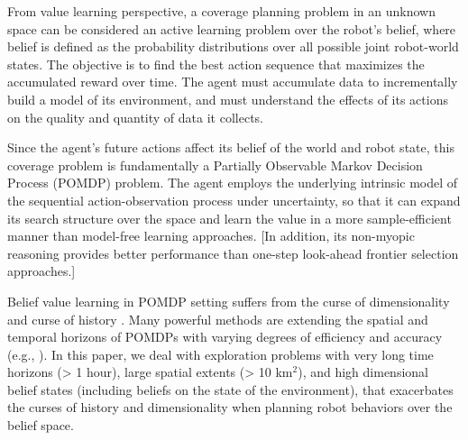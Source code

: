 \documentclass[letterpaper]{article} %
\newcommand{\phdone}[1]{} %
\begin{document}


From value learning perspective, a coverage planning problem in an unknown space can be considered an active learning problem over the robot's belief, where belief is defined as the probability distributions over all possible joint robot-world states.
%
The objective is to find the best action sequence that maximizes the accumulated reward over time.  The agent must accumulate data to incrementally build a model of its environment, and must understand the effects of its actions on the quality and quantity of data it collects.

\phdone{Problem description--POMDP perspective}
Since the agent's future actions affect its belief of the world and robot state, this coverage problem is fundamentally a Partially Observable Markov Decision Process (POMDP) problem.
The agent employs the underlying intrinsic model of the sequential action-observation process under uncertainty, so that it can %
expand its search structure over the space and learn the value in a more sample-efficient manner than model-free learning approaches.
[In addition, its non-myopic reasoning provides better performance than one-step look-ahead frontier selection approaches.]

\phdone{Gap in the state-of-the-art}
Belief value learning in POMDP setting suffers from the curse of dimensionality \cite{KLC98} and curse of history \cite{Pineau03}. Many powerful methods are extending the spatial and temporal horizons of POMDPs with varying degrees of efficiency and accuracy (e.g., \cite{silver2010monte,somani2013despot,bonet1998learning,kim2019pomhdp}). In this paper, we deal with exploration problems with very long time horizons (> 1 hour), large spatial extents (> 10 km$^2$), and high dimensional belief states (including beliefs on the state of the environment), that exacerbates the curses of history and dimensionality when planning robot behaviors over the belief space.
%
\end{document}
